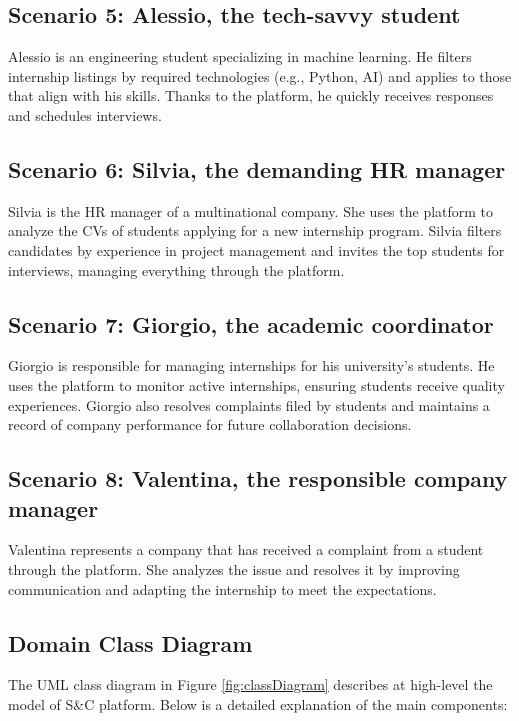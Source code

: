 \subsection*{Scenario 5: Alessio, the tech-savvy student}
Alessio is an engineering student specializing in machine learning.
He filters internship listings by required technologies (e.g., Python, AI) and applies to those that align with his skills.
Thanks to the platform, he quickly receives responses and schedules interviews.

\subsection*{Scenario 6: Silvia, the demanding HR manager}
Silvia is the HR manager of a multinational company.
She uses the platform to analyze the CVs of students applying for a new internship program.
Silvia filters candidates by experience in project management and invites the top students for interviews, managing everything through the platform.

\subsection*{Scenario 7: Giorgio, the academic coordinator}
Giorgio is responsible for managing internships for his university's students.
He uses the platform to monitor active internships, ensuring students receive quality experiences.
Giorgio also resolves complaints filed by students and maintains a record of company performance for future collaboration decisions.

\subsection*{Scenario 8: Valentina, the responsible company manager}
Valentina represents a company that has received a complaint from a student through the platform.
She analyzes the issue and resolves it by improving communication and adapting the internship to meet the expectations.


\subsection{Domain Class Diagram}\label{subsec:domain-class-diagram}
The UML class diagram in Figure \ref{fig:classDiagram} describes at high-level the model of S\&C platform.
Below is a detailed explanation of the main components:
